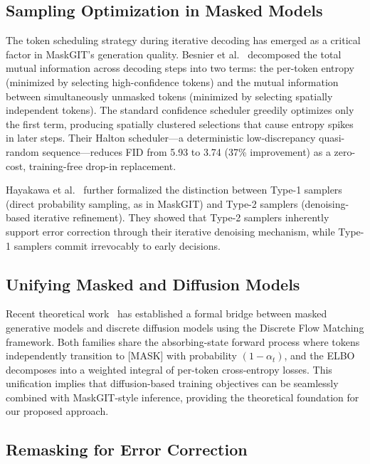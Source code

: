 \documentclass[conference]{IEEEtran}
\begin{document}
\subsection{Sampling Optimization in Masked Models}

The token scheduling strategy during iterative decoding has emerged as a critical factor in MaskGIT's generation quality. Besnier et al.~\cite{besnier2025halton} decomposed the total mutual information across decoding steps into two terms: the per-token entropy (minimized by selecting high-confidence tokens) and the mutual information between simultaneously unmasked tokens (minimized by selecting spatially independent tokens). The standard confidence scheduler greedily optimizes only the first term, producing spatially clustered selections that cause entropy spikes in later steps. Their Halton scheduler---a deterministic low-discrepancy quasi-random sequence---reduces FID from 5.93 to 3.74 (37\% improvement) as a zero-cost, training-free drop-in replacement.

Hayakawa et al.~\cite{hayakawa2025demystifying} further formalized the distinction between Type-1 samplers (direct probability sampling, as in MaskGIT) and Type-2 samplers (denoising-based iterative refinement). They showed that Type-2 samplers inherently support error correction through their iterative denoising mechanism, while Type-1 samplers commit irrevocably to early decisions.

\subsection{Unifying Masked and Diffusion Models}

Recent theoretical work~\cite{zheng2024maskdiffusion} has established a formal bridge between masked generative models and discrete diffusion models using the Discrete Flow Matching framework. Both families share the absorbing-state forward process where tokens independently transition to [MASK] with probability $(1 - \alpha_t)$, and the ELBO decomposes into a weighted integral of per-token cross-entropy losses. This unification implies that diffusion-based training objectives can be seamlessly combined with MaskGIT-style inference, providing the theoretical foundation for our proposed approach.

\subsection{Remasking for Error Correction}
\end{document}

